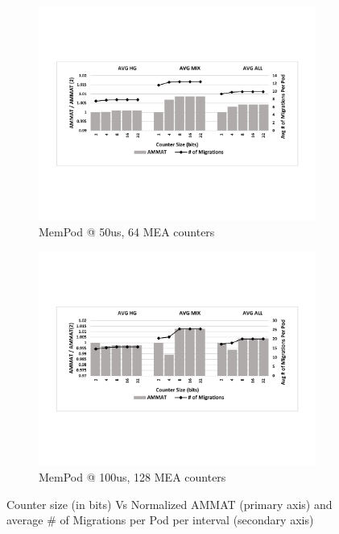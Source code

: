 \begin{figure}[h]
	\begin{subfigure}{\linewidth}
    	\includegraphics[width=\linewidth]{figures/revised/new/ctr_size.pdf}
    	\caption{MemPod @ 50us, 64 MEA counters \\ \hfill}\label{fig:counter_size}
	\end{subfigure}
	\begin{subfigure}[b]{\linewidth}
    	\includegraphics[width=\linewidth]{figures/revised/old/ctr_size.pdf}
    	\caption{MemPod @ 100us, 128 MEA counters}\label{fig:counter_size_old}
	\end{subfigure}
	\caption{Counter size (in bits) Vs Normalized AMMAT (primary axis) and average \# of Migrations per Pod per interval (secondary axis)}
\end{figure}

